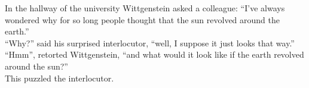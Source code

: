 \vspace*{4cm}

\begin{flushright}
\begin{minipage}[]{90mm}
In the hallway of the university Wittgenstein asked a colleague: ``I've always wondered why for so long people thought that the sun revolved around the earth.''\\

``Why?'' said his surprised interlocutor, ``well, I suppose it just looks that way.''\\

``Hmm'', retorted Wittgenstein, ``and what would it look like if the earth revolved around the sun?''\\

This puzzled the interlocutor.
\end{minipage}
\end{flushright}
